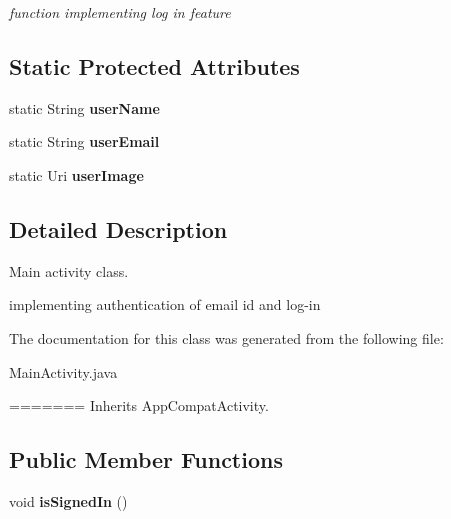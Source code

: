{\begin{DoxyCompactItemize}
\begin{DoxyCompactList}\small\item\em function implementing log in feature \end{DoxyCompactList}\end{DoxyCompactItemize}
\subsection*{Static Protected Attributes}
\begin{DoxyCompactItemize}
\item 
\hypertarget{classcom_1_1example_1_1sel_1_1lostfound_1_1MainActivity_a1a8d41b931cf85891f5fd3497d34a32a}{static String {\bfseries user\-Name}}\label{classcom_1_1example_1_1sel_1_1lostfound_1_1MainActivity_a1a8d41b931cf85891f5fd3497d34a32a}

\item 
\hypertarget{classcom_1_1example_1_1sel_1_1lostfound_1_1MainActivity_a02198420522a5b05dbc3202b74dd9a59}{static String {\bfseries user\-Email}}\label{classcom_1_1example_1_1sel_1_1lostfound_1_1MainActivity_a02198420522a5b05dbc3202b74dd9a59}

\item 
\hypertarget{classcom_1_1example_1_1sel_1_1lostfound_1_1MainActivity_a92248fd7e13b4972f457ad9791ba253c}{static Uri {\bfseries user\-Image}}\label{classcom_1_1example_1_1sel_1_1lostfound_1_1MainActivity_a92248fd7e13b4972f457ad9791ba253c}

\end{DoxyCompactItemize}


\subsection{Detailed Description}
Main activity class. 

implementing authentication of email id and log-\/in 

The documentation for this class was generated from the following file\-:\begin{DoxyCompactItemize}
\item 
Main\-Activity.\-java\end{DoxyCompactItemize}
=======
\-Inherits \-App\-Compat\-Activity.

\subsection*{\-Public \-Member \-Functions}
\begin{DoxyCompactItemize}
\item 
\hypertarget{classcom_1_1example_1_1sel_1_1lostfound_1_1MainActivity_a55b436bf176e21d22abf837dc8f2602c}{void {\bfseries is\-Signed\-In} ()}\label{classcom_1_1example_1_1sel_1_1lostfound_1_1MainActivity_a55b436bf176e21d22abf837dc8f2602c}


\end{DoxyCompactItemize}}
